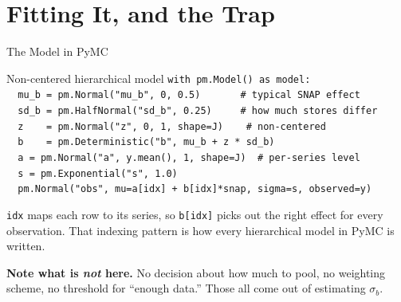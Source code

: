 \documentclass[aspectratio=169, 11pt]{beamer}
\begin{document}
\section{Fitting It, and the Trap
}


\begin{frame}{The Model in PyMC}
  \begin{examplebox}{Non-centered hierarchical model}
    {\tiny\linespread{1.05}\selectfont
    \texttt{with pm.Model() as model:}\\
    \texttt{\ \ mu\_b = pm.Normal("mu\_b", 0, 0.5)\ \ \ \ \ \ \ \# typical SNAP effect}\\
    \texttt{\ \ sd\_b = pm.HalfNormal("sd\_b", 0.25)\ \ \ \ \ \# how much stores differ}\\
    \texttt{\ \ z\ \ \ \ = pm.Normal("z", 0, 1, shape=J)\ \ \ \ \# non-centered}\\
    \texttt{\ \ b\ \ \ \ = pm.Deterministic("b", mu\_b + z * sd\_b)}\\[2pt]
    \texttt{\ \ a = pm.Normal("a", y.mean(), 1, shape=J)\ \ \# per-series level}\\
    \texttt{\ \ s = pm.Exponential("s", 1.0)}\\[2pt]
    \texttt{\ \ pm.Normal("obs", mu=a[idx] + b[idx]*snap, sigma=s, observed=y)}
    }
  \end{examplebox}
  \texttt{idx} maps each row to its series, so \texttt{b[idx]} picks out the right effect for
  every observation. That indexing pattern is how every hierarchical model in PyMC is written.

  \vspace{0.15cm}
  \textbf{Note what is \emph{not} here.} No decision about how much to pool, no weighting scheme,
  no threshold for ``enough data.'' Those all come out of estimating $\sigma_b$.
\end{frame}
\end{document}
